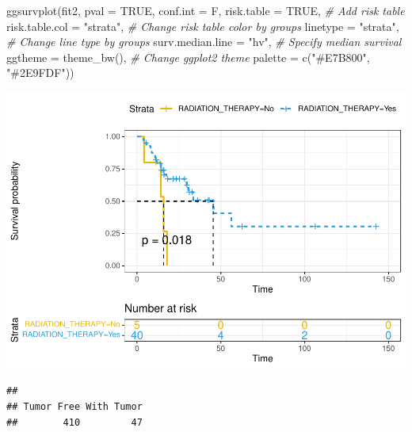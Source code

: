 \documentclass[
  11pt,
]{article}
\newenvironment{Shaded}{\begin{snugshade}}{\end{snugshade}}
\newcommand{\AttributeTok}[1]{\textcolor[rgb]{0.77,0.63,0.00}{#1}}
\newcommand{\CommentTok}[1]{\textcolor[rgb]{0.56,0.35,0.01}{\textit{#1}}}
\newcommand{\ConstantTok}[1]{\textcolor[rgb]{0.00,0.00,0.00}{#1}}
\newcommand{\FunctionTok}[1]{\textcolor[rgb]{0.00,0.00,0.00}{#1}}
\newcommand{\NormalTok}[1]{#1}
\newcommand{\SpecialCharTok}[1]{\textcolor[rgb]{0.00,0.00,0.00}{#1}}
\newcommand{\StringTok}[1]{\textcolor[rgb]{0.31,0.60,0.02}{#1}}
\begin{document}
\begin{Shaded}
\begin{Highlighting}[]
\FunctionTok{ggsurvplot}\NormalTok{(fit2,}
          \AttributeTok{pval =} \ConstantTok{TRUE}\NormalTok{, }\AttributeTok{conf.int =}\NormalTok{ F,}
          \AttributeTok{risk.table =} \ConstantTok{TRUE}\NormalTok{, }\CommentTok{\# Add risk table}
          \AttributeTok{risk.table.col =} \StringTok{"strata"}\NormalTok{, }\CommentTok{\# Change risk table color by groups}
          \AttributeTok{linetype =} \StringTok{"strata"}\NormalTok{, }\CommentTok{\# Change line type by groups}
          \AttributeTok{surv.median.line =} \StringTok{"hv"}\NormalTok{, }\CommentTok{\# Specify median survival}
          \AttributeTok{ggtheme =} \FunctionTok{theme\_bw}\NormalTok{(), }\CommentTok{\# Change ggplot2 theme}
          \AttributeTok{palette =} \FunctionTok{c}\NormalTok{(}\StringTok{"\#E7B800"}\NormalTok{, }\StringTok{"\#2E9FDF"}\NormalTok{))}
\end{Highlighting}
\end{Shaded}

\includegraphics{thyroid_1_files/figure-latex/unnamed-chunk-8-1.pdf}

\begin{Shaded}
\end{Shaded}

\begin{verbatim}
## 
## Tumor Free With Tumor 
##        410         47
\end{verbatim}
\end{document}

